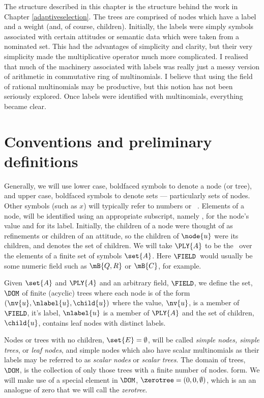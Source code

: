 The structure described in this chapter is the structure behind the
work in Chapter \ref{adaptiveselection}.  The trees are comprised of
nodes which have a label and a weight (and, of course, children).
Initially, the labels were simply symbols associated with certain
attitudes or semantic data which were taken from a nominated set.
This had the advantages of simplicity and clarity, but their very
simplicity made the multiplicative operator much more complicated. I
realised that much of the machinery associated with labels was really
just a messy version of arithmetic in commutative ring of
multinomials. I believe that using the field of rational multinomials
may be productive, but this notion has not been seriously explored.
Once labels were identified with multinomials, everything became
clear.

\section{Conventions and preliminary definitions}

Generally, we will use lower case, boldfaced symbols to denote a node
(or tree), and upper case, boldfaced symbols to denote sets ---
particularly sets of nodes.  Other symbols (such as \(x\)) will
typically refer to numbers or \polyrat\ \polyforms. Elements of a
node,  will be identified using an appropriate subscript,
namely , for the node's value and  for its
label. Initially, the children of a node were thought of as
refinements or children of an attitude, so the children of $\node{u}$
were its children, and  denotes the set of children.  We will
take $\PLY{A}$ to be the \polytypes\ over the elements of a finite set
of symbols $\set{A}$.  Here $\FIELD$\ would usually be some numeric
field such as $\mB{Q, R}$ or $\mB{C}$, for example.

\begin{definition}\label{def-of-dom}
  Given $\set{A}$ and $\PLY{A}$ and an arbitrary field, $\FIELD$, we
  define the set, $\DOM$ of finite (acyclic) trees where each node is
  of the form $(\nv{u}, \nlabel{u}, \child{u})$ where the value,
  $\nv{u}$, is a member of $\FIELD$, it's label, $\nlabel{u}$ is
  a member of $\PLY{A}$ and the set of children, $\child{u}$, contains
  leaf nodes with distinct labels.
\end{definition}

Nodes or trees with no children, \(\set{E} = \emptyset\), will be
called \emph{simple nodes, simple trees}, or \emph{leaf nodes}, and
simple nodes which also have scalar multinomials as their labels may
be referred to as \emph{scalar nodes} or \emph{scalar trees}. The
domain of trees, $\DOM$, is the collection of only those trees with a
finite number of nodes.  form. We will make use of a special element
in $\DOM$, $\zerotree = (0, 0, \emptyset)$, which is an an analogue of
zero that we will call the \emph{zerotree}.

